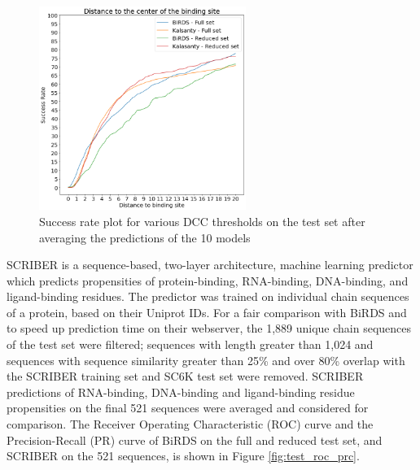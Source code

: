 \documentclass[journal=jcisd8,manuscript=article]{achemso}
\begin{document}
\begin{figure}
    \centering
    \noindent\includegraphics[width=0.6\textwidth]{test_dcc.png}
    \caption{\centering Success rate plot for various DCC thresholds on the test set after averaging the predictions of the 10 models}
    \label{fig:test_dcc}
\end{figure}

SCRIBER is a sequence-based, two-layer architecture, machine learning predictor which predicts propensities of protein-binding, RNA-binding, DNA-binding, and ligand-binding residues. The predictor was trained on individual chain sequences of a protein, based on their Uniprot IDs. For a fair comparison with BiRDS and to speed up prediction time on their webserver, the 1,889 unique chain sequences of the test set were filtered; sequences with length greater than 1,024 and sequences with sequence similarity greater than 25\% and over 80\% overlap with the SCRIBER training set and SC6K test set were removed. SCRIBER predictions of RNA-binding, DNA-binding and ligand-binding residue propensities on the final 521 sequences were averaged and considered for comparison. The Receiver Operating Characteristic (ROC) curve and the Precision-Recall (PR) curve of BiRDS on the full and reduced test set, and SCRIBER on the 521 sequences, is shown in Figure \ref{fig:test_roc_prc}.
\end{document}
